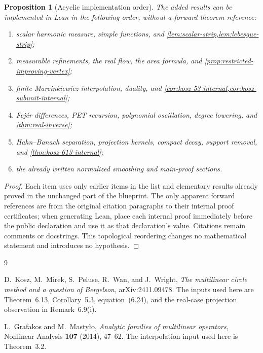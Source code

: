 \documentclass[11pt]{article}
\newtheorem{proposition}[theorem]{Proposition}
\begin{document}
	\begin{proposition}[Acyclic implementation order]\label{prop:acyclic-implementation-order}
		The added results can be implemented in Lean in the following order, without a forward theorem reference:
		\begin{enumerate}
			\item scalar harmonic measure, simple functions, and
			\cref{lem:scalar-strip,lem:lebesgue-strip};
			\item measurable refinements, the real flow, the area formula, and
			\cref{prop:restricted-improving-vertex};
			\item finite Marcinkiewicz interpolation, duality, and
			\cref{cor:kosz-53-internal,cor:kosz-subunit-internal};
			\item Fej\'er differences, PET recursion, polynomial oscillation, degree lowering, and
			\cref{thm:real-inverse};
			\item Hahn--Banach separation, projection kernels, compact decay, support removal, and
			\cref{thm:kosz-613-internal};
			\item the already written normalized smoothing and main-proof sections.
		\end{enumerate}
	\end{proposition}
	
	\begin{proof}
		Each item uses only earlier items in the list and elementary results already proved in the unchanged part of the blueprint.  The only apparent forward references are from the original citation paragraphs to their internal proof certificates; when generating Lean, place each internal proof immediately before the public declaration and use it as that declaration's value.  Citations remain comments or docstrings.  This topological reordering changes no mathematical statement and introduces no hypothesis.
	\end{proof}
	
	\begin{thebibliography}{9}
		
		D.~Kosz, M.~Mirek, S.~Peluse, R.~Wan, and J.~Wright,
		\emph{The multilinear circle method and a question of Bergelson},
		arXiv:2411.09478.
		The inputs used here are Theorem~6.13, Corollary~5.3, equation~(6.24), and the real-case projection observation in Remark~6.9(i).
		
		L.~Grafakos and M.~Masty\l o,
		\emph{Analytic families of multilinear operators},
		Nonlinear Analysis \textbf{107} (2014), 47--62.
		The interpolation input used here is Theorem~3.2.
		
	\end{thebibliography}
	
\end{document}
